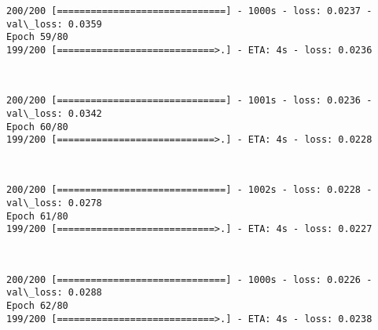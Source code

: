 \documentclass[11pt]{article}
\begin{document}
    \begin{Verbatim}[commandchars=\\\{\}]
200/200 [==============================] - 1000s - loss: 0.0237 - val\_loss: 0.0359
Epoch 59/80
199/200 [============================>.] - ETA: 4s - loss: 0.0236
    \end{Verbatim}

    \begin{center}
    \end{center}
    { \hspace*{\fill} \\}
    
    \begin{Verbatim}[commandchars=\\\{\}]
200/200 [==============================] - 1001s - loss: 0.0236 - val\_loss: 0.0342
Epoch 60/80
199/200 [============================>.] - ETA: 4s - loss: 0.0228
    \end{Verbatim}

    \begin{center}
    \end{center}
    { \hspace*{\fill} \\}
    
    \begin{Verbatim}[commandchars=\\\{\}]
200/200 [==============================] - 1002s - loss: 0.0228 - val\_loss: 0.0278
Epoch 61/80
199/200 [============================>.] - ETA: 4s - loss: 0.0227
    \end{Verbatim}

    \begin{center}
    \end{center}
    { \hspace*{\fill} \\}
    
    \begin{Verbatim}[commandchars=\\\{\}]
200/200 [==============================] - 1000s - loss: 0.0226 - val\_loss: 0.0288
Epoch 62/80
199/200 [============================>.] - ETA: 4s - loss: 0.0238
    \end{Verbatim}

    \begin{center}
    \end{center}
    { \hspace*{\fill} \\}
    
\end{document}
